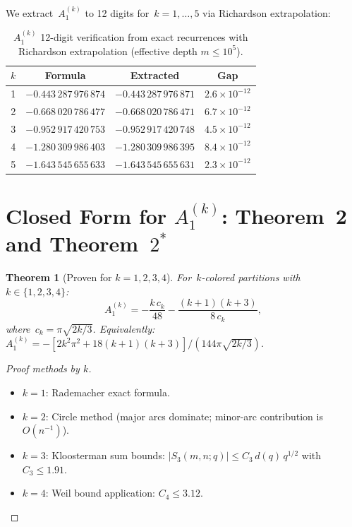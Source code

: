 \documentclass[11pt,a4paper]{article}
\newtheorem{theorem}{Theorem}[section]
\begin{document}
We extract~$A_1^{(k)}$ to 12 digits for~$k = 1, \ldots, 5$ via Richardson extrapolation:

\begin{table}[ht]
\centering
\caption{$A_1^{(k)}$ 12-digit verification from exact recurrences with Richardson extrapolation (effective depth $m\le 10^5$).}
\label{tab:A1}
\begin{tabular}{@{}cccc@{}}
\toprule
$k$ & Formula & Extracted & Gap \\
\midrule
1 & $-0.443\,287\,976\,874$ & $-0.443\,287\,976\,871$ & $2.6\times 10^{-12}$ \\
2 & $-0.668\,020\,786\,477$ & $-0.668\,020\,786\,471$ & $6.7\times 10^{-12}$ \\
3 & $-0.952\,917\,420\,753$ & $-0.952\,917\,420\,748$ & $4.5\times 10^{-12}$ \\
4 & $-1.280\,309\,986\,403$ & $-1.280\,309\,986\,395$ & $8.4\times 10^{-12}$ \\
5 & $-1.643\,545\,655\,633$ & $-1.643\,545\,655\,631$ & $2.3\times 10^{-12}$ \\
\bottomrule
\end{tabular}
\end{table}

\section{Closed Form for \texorpdfstring{$A_1^{(k)}$}{A1(k)}: Theorem~2 and Theorem~\texorpdfstring{$2^*$}{2*}}\label{sec:theorem2}

\begin{theorem}[Proven for $k = 1, 2, 3, 4$]\label{thm:A1k}
For~$k$-colored partitions with~$k \in \{1,2,3,4\}$:
\begin{equation}\label{eq:A1k}
  A_1^{(k)} = -\frac{k\,c_k}{48} - \frac{(k+1)(k+3)}{8\,c_k},
\end{equation}
where~$c_k = \pi\sqrt{2k/3}$.
Equivalently:~$A_1^{(k)} = -[2k^2\pi^2 + 18(k+1)(k+3)]/(144\pi\sqrt{2k/3})$.
\end{theorem}

\begin{proof}[Proof methods by $k$]
\begin{itemize}
  \item $k=1$: Rademacher exact formula.
  \item $k=2$: Circle method (major arcs dominate; minor-arc contribution is $O(n^{-1})$).
  \item $k=3$: Kloosterman sum bounds: $|S_3(m,n;q)| \leq C_3\,d(q)\,q^{1/2}$ with $C_3 \leq 1.91$.
  \item $k=4$: Weil bound application: $C_4 \leq 3.12$.
\end{itemize}
\end{proof}
\end{document}
